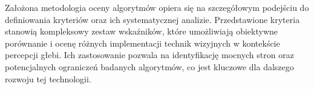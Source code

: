 Założona metodologia oceny algorytmów opiera się na szczegółowym podejściu do definiowania kryteriów oraz ich systematycznej analizie. Przedstawione kryteria stanowią kompleksowy zestaw wskaźników, które umożliwiają obiektywne porównanie i ocenę różnych implementacji technik wizyjnych w kontekście percepcji głebi. Ich zastosowanie pozwala na identyfikację mocnych stron oraz potencjalnych ograniczeń badanych algorytmów, co jest kluczowe dla dalszego rozwoju tej technologii.
